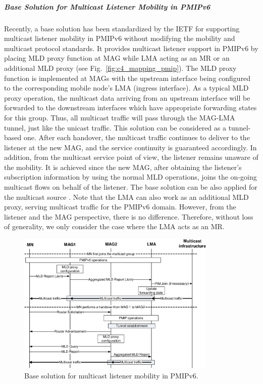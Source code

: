 \subparagraph{Base Solution for Multicast Listener Mobility in PMIPv6}
Recently, a base solution \cite{RFC_6224} has been standardized by the IETF for supporting multicast listener mobility in PMIPv6 without modifying the mobility and multicast protocol standards. It provides multicast listener support in PMIPv6 by placing MLD proxy function at MAG while LMA acting as an MR or an additional MLD proxy (see Fig.~\ref{fig:c4_mapping_pmip}). The MLD proxy function is implemented at MAGs with the upstream interface being configured to the corresponding mobile node’s LMA (ingress interface). As a typical MLD proxy operation, the multicast data arriving from an upstream interface will be forwarded to the downstream interfaces which have appropriate forwarding states for this group. Thus, all multicast traffic will pass through the MAG-LMA tunnel, just like the unicast traffic. This solution can be considered as a tunnel-based one. After each handover, the multicast traffic continues to deliver to the listener at the new MAG, and the service continuity is guaranteed accordingly. In addition, from the multicast service point of view, the listener remains unaware of the mobility. It is achieved since the new MAG, after obtaining the listener's subscription information by using the normal MLD operations, joins the on-going multicast flows on behalf of the listener. The base solution can be also applied for the multicast source \cite{multicast_source}. Note that the LMA can also work as an additional MLD proxy, serving multicast traffic for the PMIPv6 domain. However, from the listener and the MAG perspective, there is no difference. Therefore, without loss of generality, we only consider the case where the LMA acts as an MR.
\begin{figure}[h!] 
 \begin{center} 
 \includegraphics[width=0.85\textwidth]{./Part1/Chapter2/figures/c4_base_solution.eps} 
    \caption{Base solution for multicast listener mobility in PMIPv6.}
     \label{fig:c4_base_solution}
  \end{center} 
\end{figure} 

